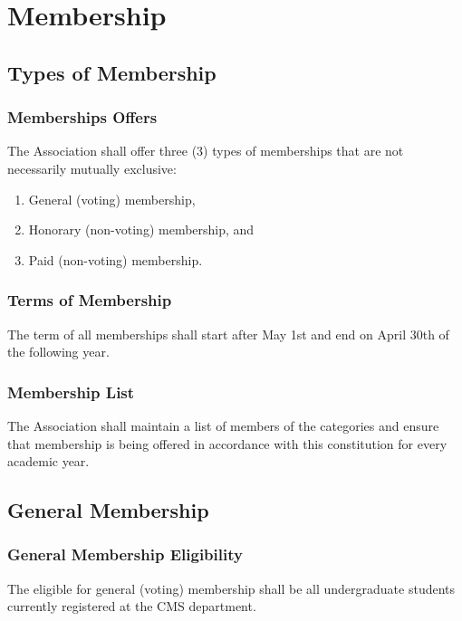 \chapter{Membership}

\section{Types of Membership}

\subsection{Memberships Offers}
The Association shall offer three (3) types of memberships that are not 
necessarily mutually exclusive:
\begin{enumerate}

    \item General (voting) membership,

    \item Honorary (non-voting) membership, and

    \item Paid (non-voting) membership.

\end{enumerate}

\subsection{Terms of Membership}
The term of all memberships shall start after May 1st and end on April 
30th of the following year.

\subsection{Membership List}
The Association shall maintain a list of members of the categories
and ensure that membership is being offered in accordance with
this constitution for every academic year.

\section{General Membership}

\subsection{General Membership Eligibility}
The eligible for general (voting) membership shall be all undergraduate
students currently registered at the CMS department.

